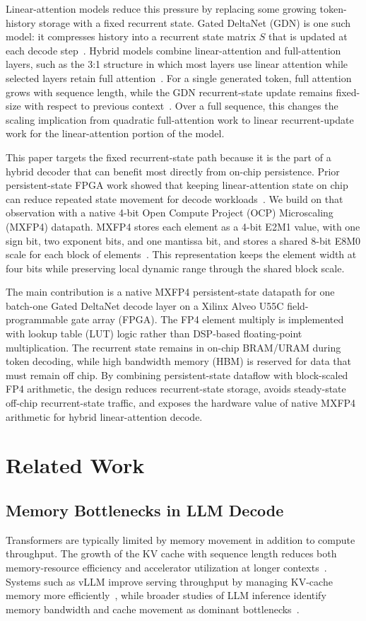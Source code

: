 \documentclass[conference]{IEEEtran}
\begin{document}
Linear-attention models reduce this pressure by replacing some growing token-history storage with a fixed recurrent state. Gated DeltaNet (GDN) is one such model: it compresses history into a recurrent state matrix $S$ that is updated at each decode step~\cite{b4}. Hybrid models combine linear-attention and full-attention layers, such as the 3:1 structure in which most layers use linear attention while selected layers retain full attention~\cite{b5}. For a single generated token, full attention grows with sequence length, while the GDN recurrent-state update remains fixed-size with respect to previous context~\cite{b4}. Over a full sequence, this changes the scaling implication from quadratic full-attention work to linear recurrent-update work for the linear-attention portion of the model.

This paper targets the fixed recurrent-state path because it is the part of a hybrid decoder that can benefit most directly from on-chip persistence. Prior persistent-state FPGA work showed that keeping linear-attention state on chip can reduce repeated state movement for decode workloads~\cite{b6}. We build on that observation with a native 4-bit Open Compute Project (OCP) Microscaling (MXFP4) datapath. MXFP4 stores each element as a 4-bit E2M1 value, with one sign bit, two exponent bits, and one mantissa bit, and stores a shared 8-bit E8M0 scale for each block of elements~\cite{b7}. This representation keeps the element width at four bits while preserving local dynamic range through the shared block scale.

The main contribution is a native MXFP4 persistent-state datapath for one batch-one Gated DeltaNet decode layer on a Xilinx Alveo U55C field-programmable gate array (FPGA). The FP4 element multiply is implemented with lookup table (LUT) logic rather than DSP-based floating-point multiplication. The recurrent state remains in on-chip BRAM/URAM during token decoding, while high bandwidth memory (HBM) is reserved for data that must remain off chip. By combining persistent-state dataflow with block-scaled FP4 arithmetic, the design reduces recurrent-state storage, avoids steady-state off-chip recurrent-state traffic, and exposes the hardware value of native MXFP4 arithmetic for hybrid linear-attention decode.

\section{Related Work}

\subsection{Memory Bottlenecks in LLM Decode}
Transformers are typically limited by memory movement in addition to compute throughput. The growth of the KV cache with sequence length reduces both memory-resource efficiency and accelerator utilization at longer contexts~\cite{b2,b3}. Systems such as vLLM improve serving throughput by managing KV-cache memory more efficiently~\cite{b8}, while broader studies of LLM inference identify memory bandwidth and cache movement as dominant bottlenecks~\cite{b3,b9}.
\end{document}
